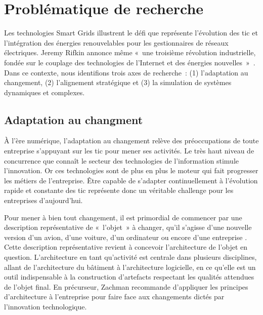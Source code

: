  
\section{Problématique de recherche}


Les technologies Smart Grids illustrent le défi que représente l'évolution des 
\gls{tic} et l'intégration des énergies renouvelables pour les gestionnaires de 
réseaux électriques. Jeremy Rifkin annonce même «~une troisième révolution 
industrielle, fondée sur le couplage des technologies de l’Internet et des 
énergies nouvelles~»~\cite{rifkin2012troisieme}. Dans ce contexte, nous identifions
trois axes de recherche~: (1) l'adaptation au changement, (2) l'alignement stratégique et
(3) la simulation de systèmes dynamiques et complexes.



\subsection{Adaptation au changment}

À l'ère numérique, l'adaptation au changement relève des préoccupations de 
toute entreprise s'appuyant sur les \gls{tic} pour mener ses 
activités. Le très haut niveau de concurrence que connaît le secteur des 
technologies de l'information stimule l'innovation. Or ces technologies sont de 
plus en plus le moteur qui fait progresser les  métiers de l'entreprise. Être 
capable de s'adapter continuellement à l'évolution rapide et 
constante des \gls{tic} représente donc un véritable challenge pour les 
entreprises 
d'aujourd'hui.

Pour mener à bien tout changement, il est primordial de commencer par une 
description représentative de «~l'objet~» à changer, qu'il s'agisse d'une 
nouvelle version d'un avion, d'une voiture, d'un ordinateur ou encore d'une 
entreprise \cite{zachman1997enterprise}. Cette description représentative 
revient à concevoir l'architecture de l'objet en question. L'architecture en 
tant qu'activité est centrale dans plusieurs disciplines, allant de 
l'architecture du bâtiment à l'architecture logicielle, en ce qu'elle est un 
outil indispensable à la construction d'artefacts respectant les qualités 
attendues de l'objet final. En précurseur, Zachman \cite{zachman1997enterprise} 
recommande d'appliquer les principes d'architecture à l'entreprise pour faire 
face aux changements dictés par l'innovation technologique.

